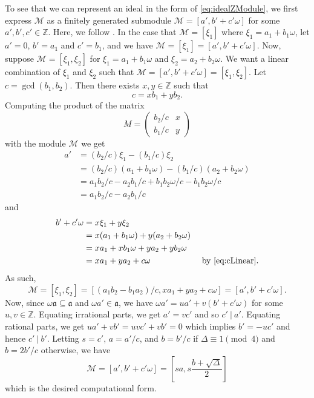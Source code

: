 \documentclass{ucalgthes1}
\theoremstyle{plain}
\theoremstyle{definition}
\newcommand{\MM}{\mathcal{M}}
\newcommand{\ZZ}{\mathbb{Z}}
\newcommand{\matrixtt}[4]{\left( \begin{array}{rr} #1 & #2 \\ #3 & #4 \end{array} \right)}
\begin{document}
To see that we can represent an ideal in the form of \eqref{eq:idealZModule}, we first express $\MM$ as a finitely generated submodule $\MM=[a',b'+c'\omega]$ for some $a',b',c' \in \ZZ$.  Here, we follow \cite[pp~85-86]{Jac09}.  In the case that $\MM = [\xi_1]$ where $\xi_1 = a_1+b_1\omega$, let $a'=0$, $b' = a_1$ and $c'=b_1$, and we have $\MM = [\xi_1] = [a', b'+c'\omega]$.  Now, suppose $\MM = [\xi_1, \xi_2]$ for $\xi_1 = a_1 + b_1\omega$ and $\xi_2 = a_2+b_2\omega$.  We want a linear combination of $\xi_1$ and $\xi_2$ such that $\MM = [a',b'+c'\omega] = [\xi_1, \xi_2]$.  Let $c = \gcd(b_1, b_2)$.  Then there exists $x,y \in \ZZ$ such that 
\begin{equation}
\label{eq:cLinear}
	c = xb_1 + yb_2.
\end{equation}
Computing the product of the matrix
\[
	M = \matrixtt{b_2/c}{x}{b_1/c}{y}
\]
with the module $\MM$ we get
\begin{align*}
	a' &= (b_2/c) \xi_1 - (b_1/c) \xi_2  \\
	&= (b_2/c) (a_1+b_1\omega) - (b_1/c) (a_2+b_2\omega)  \\
	&= a_1b_2/c -a_2b_1/c + b_1b_2\omega/c -b_1b_2\omega/c \\
	&= a_1b_2/c - a_2b_1/c
\end{align*}
and
\begin{align*}
	b'+c'\omega &= x\xi_1 + y\xi_2 \\
	&= x(a_1+b_1\omega) + y(a_2+b_2\omega) \\
	&= xa_1+xb_1\omega + ya_2+yb_2\omega \\
	&= xa_1 + ya_2 + c\omega & \mbox{ by \eqref{eq:cLinear}}.
\end{align*}
As such, 
\[
	\MM = [\xi_1,\xi_2] = [(a_1b_2-b_1a_2)/c, xa_1+ya_2+c\omega] = [a',b'+c'\omega].
\]
Now, since $\omega\mathfrak a \subseteq \mathfrak a$ and $\omega a' \in \mathfrak a$, we have $\omega a' = ua' + v(b'+c'\omega)$ for some $u,v \in \ZZ$. Equating irrational parts, we get $a' = vc'$ and so $c'~|~a'$.  Equating rational parts, we get $ua'+vb' = uvc'+vb' = 0$ which implies $b' = -uc'$ and hence $c'~|~b'$.  Letting $s=c'$, $a=a'/c$, and $b = b'/c$ if $\Delta \equiv 1 \pmod 4$ and $b = 2b'/c$ otherwise, we have
\[
	\MM = [a', b'+c'\omega] = \left[sa, s\frac{b+ \sqrt{\Delta}}{2} \right]
\]
which is the desired computational form.
\end{document}
